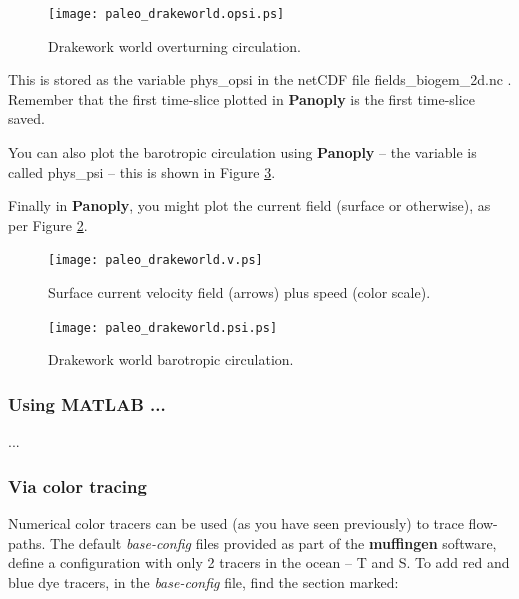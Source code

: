 \documentclass[11pt,fleqn]{book} %
\begin{document}
\begin{figure}
\texttt{[image: paleo\_drakeworld.opsi.ps]}\centering
\vspace{-6mm}
\caption{Drakework world overturning circulation.}
\label{fig:paleo_drakeworld.opsi}
\end{figure}

This is stored as the variable \small\textsf{phys\_opsi }\normalsize in the netCDF file \small\textsf{fields\_biogem\_2d.nc }\normalsize. Remember that the first time-slice plotted in \textbf{Panoply} is the first time-slice saved.

You can also plot the barotropic circulation using \textbf{Panoply} -- the variable is called \small\textsf{phys\_psi }\normalsize -- this is shown in Figure \ref{fig:paleo_drakeworld.psi}.

Finally in \textbf{Panoply}, you might plot the current field (surface or otherwise), as per Figure \ref{fig:paleo_drakeworld.v}.

\begin{figure}
\texttt{[image: paleo\_drakeworld.v.ps]}\centering
\vspace{-6mm}
\caption{Surface current velocity field (arrows) plus speed (color scale).}
\label{fig:paleo_drakeworld.v}
\end{figure}

\begin{figure}
\texttt{[image: paleo\_drakeworld.psi.ps]}\centering
\vspace{-6mm}
\caption{Drakework world barotropic circulation.}
\label{fig:paleo_drakeworld.psi}
\end{figure}


\subsubsection{Using MATLAB ...}

...


\subsubsection{Via color tracing}

Numerical color tracers can be used (as you have seen previously) to trace flow-paths. The default \textit{base-config} files provided as part of the \textbf{muffingen} software, define a configuration with only 2 tracers in the ocean -- T and S. To add red and blue dye tracers, in the \textit{base-config} file, find the section marked:
\end{document}
